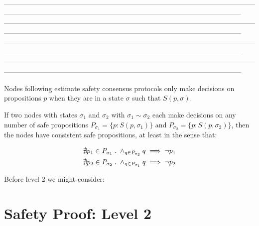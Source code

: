 \documentclass{article}
\theoremstyle{definition}
\begin{document}
------------------------------------------------------------------------------------------------------------------------------------------------------------------------------------------------------------------
------------------------------------------------------------------------------------------------------------------------------------------------------------------------------------------------------------------
------------------------------------------------------------------------------------------------------------------------------------------------------------------------------------------------------------------
------------------------------------------------------------------------------------------------------------------------------------------------------------------------------------------------------------------

\fi

\iffalse



Nodes following estimate safety consensus protocols only make decisions on propositions $p$ when they are in a state $\sigma$ such that $S(p,\sigma)$.

If two nodes with states $\sigma_1$ and $\sigma_2$ with $\sigma_1 \sim \sigma_2$ each make decisions on any number of safe propositions $P_{\sigma_1} = \{p: S(p,\sigma_1)\}$ and $P_{\sigma_2} = \{p: S(p,\sigma_2)\}$, then the nodes have consistent safe propositions, at least in the sense that:

\begin{align*}
\nexists p_1 \in P_{\sigma_1} \hspace{1mm} &. \hspace{1mm} \land_{q \in P_{\sigma_2}} q \implies \neg{p_1} \\
\nexists p_2 \in P_{\sigma_2} \hspace{1mm} &. \hspace{1mm} \land_{q \in P_{\sigma_1}} q \implies \neg{p_2}
\end{align*}



\pagebreak
\pagebreak



Before level 2 we might consider:

\section{Safety Proof: Level 2}
\end{document}
